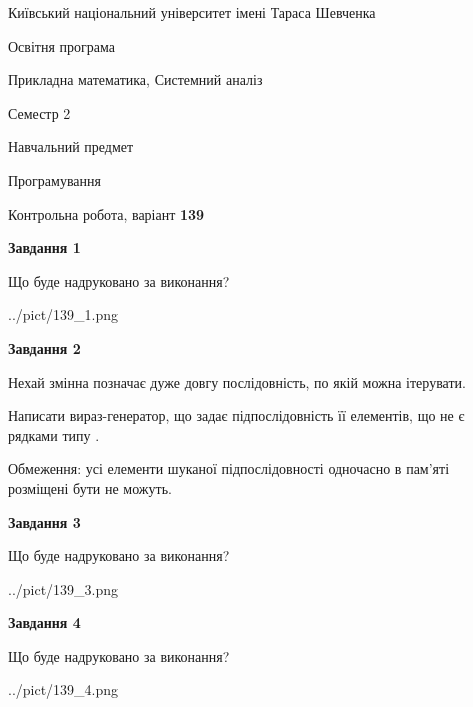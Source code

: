 \documentclass[12pt, ukrainian]{article}
\begin{document}
{{\begin {small}\par
{ \center  Київський національний університет імені Тараса Шевченка \par}
{\parbox {5 cm}{Освітня програма \hfill}{\parbox {8 cm}{Прикладна математика, Системний аналіз \hfill}}\parbox {5 cm}{\hfill Семестр 2}}\par
{\parbox {5 cm} {Навчальний предмет \hfill}\parbox {7 cm}{Програмування \hfill}\parbox {6cm}{\hfill}\par}\vspace{-7pt} \end{small}}{\center Контрольна робота, варіант  \No \textbf
{ 139 }\par}}
{
\begin {large}
{\begin {center}\textbf{Завдання 1}\end {center}}\par
Що буде надруковано за виконання?\par\par
\begin{center}
	{../pict/139_1.png}
\end{center}
\newpage

{\begin {center}\textbf{Завдання 2}\end {center}}\par
Нехай змінна  позначає дуже довгу послідовність, по якій можна ітерувати.

Написати вираз-генератор, що задає підпослідовність її елементів, що не є рядками типу .

Обмеження: усі елементи шуканої підпослідовності одночасно в пам'яті розміщені бути не можуть.\par
\newpage

{\begin {center}\textbf{Завдання 3}\end {center}}\par
Що буде надруковано за виконання?
\begin{center}
	{../pict/139_3.png}
\end{center}
\newpage

{\begin {center}\textbf{Завдання 4}\end {center}}\par
Що буде надруковано за виконання?\par
\begin{center}
	{../pict/139_4.png}
\end{center}
\newpage


\end{large}}
\end{document}
